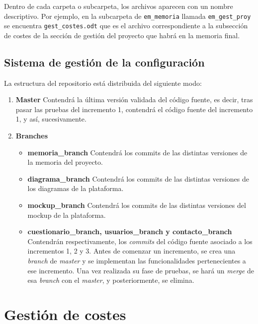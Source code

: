Dentro de cada carpeta o subcarpeta, los archivos aparecen con un nombre descriptivo. Por ejemplo, en la subcarpeta de \texttt{em\_memoria} llamada \texttt{em\_gest\_proy} se encuentra \texttt{gest\_costes.odt} que es el archivo correspondiente a la subsección de costes de la sección de gestión del proyecto que habrá en la memoria final.

\subsection{Sistema de gestión de la configuración}
La estructura del repositorio está distribuida del siguiente modo:

\begin{enumerate}
\item \textbf{Master}
Contendrá la última versión validada del código fuente, es decir, tras pasar las pruebas del incremento 1, contendrá el código fuente del incremento 1, y así, sucesivamente.
\item \textbf{Branches}
	\begin{itemize}
	\item \textbf{memoria\_branch}
	Contendrá los commits de las distintas versiones de la memoria del proyecto.
	\item \textbf{diagrama\_branch}
	Contendrá los commits de las distintas versiones de los diagramas de la plataforma.
	\item \textbf{mockup\_branch}
	Contendrá los commits de las distintas versiones del mockup de la plataforma.
	\item \textbf{cuestionario\_branch, usuarios\_branch y contacto\_branch}
	Contendrán respectivamente, los \textit{commits} del código fuente asociado a los incrementos 1, 2 y 3.
	Antes de comenzar un incremento, se crea una \textit{branch} de \textit{master} y se implementan las funcionalidades pertenecientes a ese incremento. Una vez realizada su fase de pruebas, se hará un \textit{merge} de esa \textit{branch} con el \textit{master}, y posteriormente, se elimina.
	\end{itemize}
\end{enumerate}



\section{Gestión de costes}


